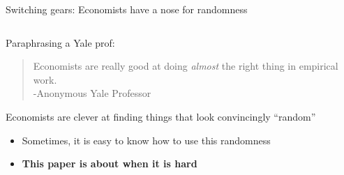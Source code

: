 \documentclass[notes,11pt, aspectratio=169]{beamer}
\newenvironment{wideitemize}{\itemize\addtolength{\itemsep}{10pt}}{\enditemize}
\begin{document}
\begin{frame}{Switching gears: Economists have a nose for randomness}
\begin{columns}[T] %
\begin{column}{.5\textwidth}
  \begin{wideitemize}
  \item Paraphrasing a Yale prof:
    \begin{quote}
      Economists are really good at doing \emph{almost} the right
      thing in empirical work.\\
      \hfill -Anonymous Yale Professor
    \end{quote}
  \item Economists are clever at finding things that look convincingly
    ``random''
    \begin{itemize}
    \item Sometimes, it is easy to know how to use this randomness
    \item \textbf{This paper is about when it is hard}
    \end{itemize}
  \end{wideitemize}
\end{column}%
\hfill%
\begin{column}{.5\textwidth}
\end{column}%
\end{columns}
\end{frame}
\end{document}

